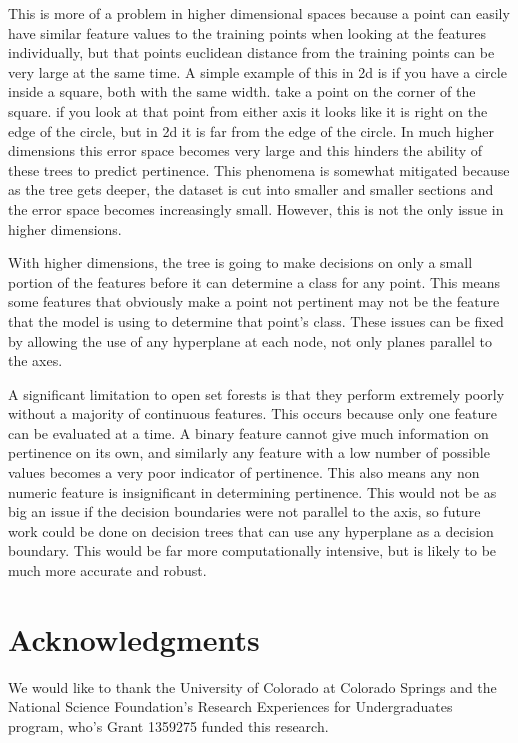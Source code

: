 \documentclass[conference]{IEEEtran}
\begin{document}
This is more of a problem in higher dimensional spaces because a point can easily have similar feature values to the training points when looking at the features individually, but that points euclidean distance from the training points can be very large at the same time.  A simple example of this in 2d is if you have a circle inside a square, both with the same width.  take a point on the corner of the square.  if you look at that point from either axis it looks like it is right on the edge of the circle, but in 2d it is far from the edge of the circle.  In much higher dimensions this error space becomes very large and this hinders the ability of these trees to predict pertinence.  This phenomena is somewhat mitigated because as the tree gets deeper, the dataset is cut into smaller and smaller sections and the error space becomes increasingly small.  However, this is not the only issue in higher dimensions.

With higher dimensions, the tree is going to make decisions on only a small portion of the features before it can determine a class for any point.  This means some features that obviously make a point not pertinent may not be the feature that the model is using to determine that point's class.  These issues can be fixed by allowing the use of any hyperplane at each node, not only planes parallel to the axes.

A significant limitation to open set forests is that they perform extremely poorly without a majority of continuous features.  This occurs because only one feature can be evaluated at a time.  A binary feature cannot give much information on pertinence on its own, and similarly any feature with a low number of possible values becomes a very poor indicator of pertinence.  This also means any non numeric feature is insignificant in determining pertinence.  This would not be as big an issue if the decision boundaries were not parallel to the axis, so future work could be done on decision trees that can use any hyperplane as a decision boundary.  This would be far more computationally intensive, but is likely to be much more accurate and robust.

\section{Acknowledgments}
We would like to thank the University of Colorado at Colorado Springs and the National Science Foundation's Research Experiences for Undergraduates program, who's Grant 1359275 funded this research.


\end{document}
